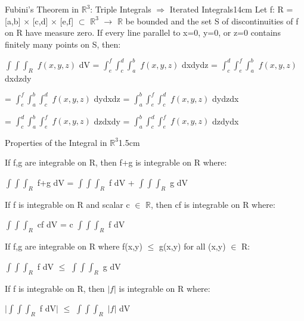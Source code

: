    \begin{wtheorem}{Fubini's Theorem in $\mathbb{R}^3$:
    Triple Integrals $\Rightarrow$ Iterated Integrals}{14cm}
        Let f: R = [a,b] $\times$ [c,d] $\times$ [e,f] $\subset$ $\mathbb{R}^3$
        $\rightarrow$ $\mathbb{R}$ be bounded and the set S of
        discontinuities of f on R have measure zero.
        If every line parallel to x=0, y=0, or z=0 contains finitely
        many points on S, then:

        \hspace{0.2cm}
        $\int \int \int_R$ $f(x,y,z)$ dV
        = $\int_e^f \int_c^d \int_a^b$ $f(x,y,z)$ dxdydz
        = $\int_c^d \int_e^f \int_a^b$ $f(x,y,z)$ dxdzdy
        
        \hspace{3.75cm}
        = $\int_e^f \int_a^b \int_c^d$ $f(x,y,z)$ dydxdz
        = $\int_a^b \int_e^f \int_c^d$ $f(x,y,z)$ dydzdx

        \hspace{3.75cm}
        = $\int_c^d \int_a^b \int_e^f$ $f(x,y,z)$ dzdxdy
        = $\int_a^b \int_c^d \int_e^f$ $f(x,y,z)$ dzdydx
    \end{wtheorem}

    \vspace{0.5cm}



    \begin{ltheorem}{Properties of the Integral in $\mathbb{R}^3$}{1.5cm}
        \item If f,g are integrable on R, then f+g is integrable on R where:
        
            \hspace{0.5cm}
            $\int \int \int_R$ f+g dV
            = $\int \int \int_R$ f dV + $\int \int \int_R$ g dV

        \item If f is integrable on R and scalar c $\in$ $\mathbb{R}$,
            then cf is integrable on R where:
        
            \hspace{0.5cm}
            $\int \int \int_R$ cf dV
            = c $\int \int \int_R$ f dV

        \item If f,g are integrable on R where f(x,y) $\leq$ g(x,y) for all
            (x,y) $\in$ R:
        
            \hspace{0.5cm}
            $\int \int \int_R$ f dV
            $\leq$ $\int \int \int_R$ g dV

        \item If f is integrable on R, then $|f|$ is integrable on R where:
        
            \hspace{0.5cm}
            $|$$\int \int \int_R$ f dV$|$
            $\leq$ $\int \int \int_R$ $|f|$ dV
    \end{ltheorem}

